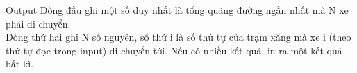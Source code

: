 Output
Dòng đầu ghi một số duy nhất là tổng quãng đường ngắn nhất mà N xe phải di chuyển.   
\\   Dòng thứ hai ghi N số nguyên, số thứ i là số thứ tự của trạm xăng mà xe i (theo thứ tự đọc trong input) di chuyển tới. Nếu có nhiều kết quả, in ra một kết quả bất kì.